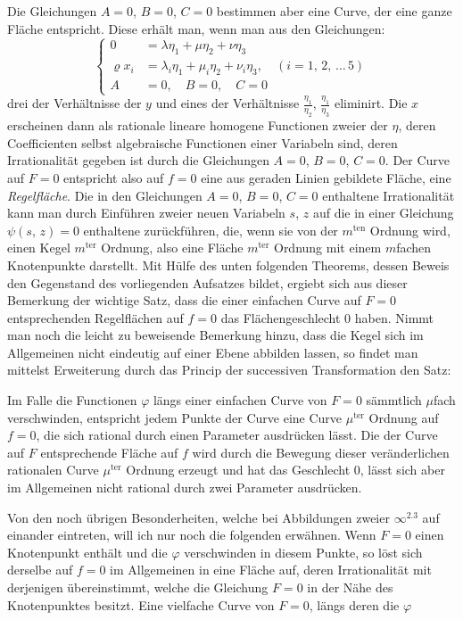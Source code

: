 \documentclass{article}
\begin{document}
Die Gleichungen $A = 0$, $B = 0$, $C = 0$ bestimmen aber eine Curve, der eine ganze Fläche entspricht. Diese erhält man, wenn man aus den Gleichungen:
\[
\left\{
\begin{aligned}
0 &= \lambda \eta_1 + \mu \eta_2 + \nu \eta_3 \\
\varrho x_i &= \lambda_i \eta_1 + \mu_i \eta_2 + \nu_i \eta_3, \quad (i = 1,\, 2,\, \dots\, 5) \\
A &= 0, \quad B = 0, \quad C = 0
\end{aligned}
\right.
\]
drei der Verhältnisse der $y$ und eines der Verhältnisse $\frac{\eta_1}{\eta_2}$, $\frac{\eta_1}{\eta_3}$ eliminirt. Die $x$ erscheinen dann als rationale lineare homogene Functionen zweier der $\eta$, deren Coefficienten selbst algebraische Functionen einer Variabeln sind, deren Irrationalität gegeben ist durch die Gleichungen $A = 0$, $B = 0$, $C = 0$. Der Curve auf $F = 0$ entspricht also auf $f = 0$ eine aus geraden Linien gebildete Fläche, eine \emph{Regelfläche}. Die in den Gleichungen $A = 0$, $B = 0$, $C = 0$ enthaltene Irrationalität kann man durch Einführen zweier neuen Variabeln $s$, $z$ auf die in einer Gleichung $\psi(s,\, z) = 0$ enthaltene zurückführen, die, wenn sie von der $m^{\text{ten}}$ Ordnung wird, einen Kegel $m^{\text{ter}}$ Ordnung, also eine Fläche $m^{\text{ter}}$ Ordnung mit einem $m$fachen Knotenpunkte darstellt. Mit Hülfe des unten folgenden Theorems, dessen Beweis den Gegenstand des vorliegenden Aufsatzes bildet, ergiebt sich aus dieser Bemerkung der wichtige Satz, dass die einer einfachen Curve auf $F = 0$ entsprechenden Regelflächen auf $f = 0$ das Flächengeschlecht $0$ haben. Nimmt man noch die leicht zu beweisende Bemerkung hinzu, dass die Kegel sich im Allgemeinen nicht eindeutig auf einer Ebene abbilden lassen, so findet man mittelst Erweiterung durch das Princip der successiven Transformation den Satz:

Im Falle die Functionen $\varphi$ längs einer einfachen Curve von $F = 0$ sämmtlich $\mu$fach verschwinden, entspricht jedem Punkte der Curve eine Curve $\mu^{\text{ter}}$ Ordnung auf $f = 0$, die sich rational durch einen Parameter ausdrücken lässt. Die der Curve auf $F$ entsprechende Fläche auf $f$ wird durch die Bewegung dieser veränderlichen rationalen Curve $\mu^{\text{ter}}$ Ordnung erzeugt und hat das Geschlecht $0$, lässt sich aber im Allgemeinen nicht rational durch zwei Parameter ausdrücken.

Von den noch übrigen Besonderheiten, welche bei Abbildungen zweier $\infty^{2.3}$ auf einander eintreten, will ich nur noch die folgenden erwähnen. Wenn $F = 0$ einen Knotenpunkt enthält und die $\varphi$ verschwinden in diesem Punkte, so löst sich derselbe auf $f = 0$ im Allgemeinen in eine Fläche auf, deren Irrationalität mit derjenigen übereinstimmt, welche die Gleichung $F = 0$ in der Nähe des Knotenpunktes besitzt. Eine vielfache Curve von $F = 0$, längs deren die $\varphi$
\end{document}
